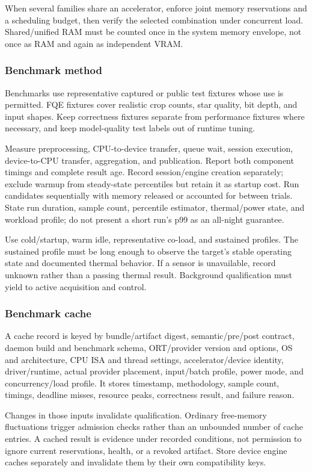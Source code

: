 \documentclass[11pt,a4paper]{article}
\begin{document}
When several families share an accelerator, enforce joint memory reservations
and a scheduling budget, then verify the selected combination under concurrent
load. Shared/unified RAM must be counted once in the system memory envelope,
not once as RAM and again as independent VRAM.

\subsubsection{Benchmark method}
Benchmarks use representative captured or public test fixtures whose use is
permitted. FQE fixtures cover realistic crop counts, star quality, bit depth,
and input shapes. Keep correctness fixtures separate from performance fixtures
where necessary, and keep model-quality test labels out of runtime tuning.

Measure preprocessing, CPU-to-device transfer, queue wait, session execution,
device-to-CPU transfer, aggregation, and publication. Report both component
timings and complete result age. Record session/engine creation separately;
exclude warmup from steady-state percentiles but retain it as startup cost.
Run candidates sequentially with memory released or accounted for between
trials. State run duration, sample count, percentile estimator, thermal/power
state, and workload profile; do not present a short run's p99 as an all-night
guarantee.

Use cold/startup, warm idle, representative co-load, and sustained profiles.
The sustained profile must be long enough to observe the target's stable
operating state and documented thermal behavior. If a sensor is unavailable,
record unknown rather than a passing thermal result. Background qualification
must yield to active acquisition and control.

\subsubsection{Benchmark cache}
A cache record is keyed by bundle/artifact digest, semantic/pre/post contract,
daemon build and benchmark schema, ORT/provider version and options, OS and
architecture, CPU ISA and thread settings, accelerator/device identity,
driver/runtime, actual provider placement, input/batch profile, power mode,
and concurrency/load profile. It stores timestamp, methodology, sample count,
timings, deadline misses, resource peaks, correctness result, and failure reason.

Changes in those inputs invalidate qualification. Ordinary free-memory
fluctuations trigger admission checks rather than an unbounded number of cache
entries. A cached result is evidence under recorded conditions, not permission
to ignore current reservations, health, or a revoked artifact. Store device
engine caches separately and invalidate them by their own compatibility keys.
\end{document}
